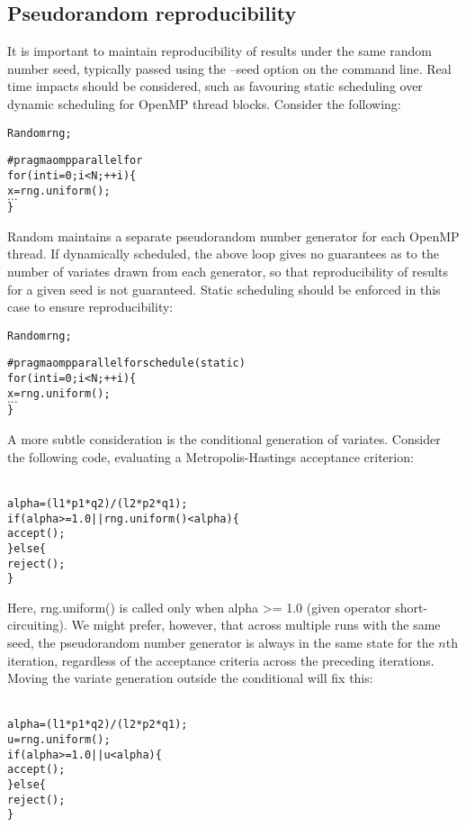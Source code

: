 \subsection{Pseudorandom reproducibility\label{Pseudorandom_reproducibility}}

It is important to maintain reproducibility of results under the same random
number seed, typically passed using the
\textsf{--seed} option on the command line. Real time impacts should be
considered, such as favouring static scheduling over
dynamic scheduling for OpenMP thread
blocks. Consider the following:
\begin{alltt}{\sf
    Random rng;

    #pragma omp parallel for
    for (int i = 0; i < N; ++i) \{
       x = rng.uniform();
       \(\ldots\)
    \}
}\end{alltt}

\textsf{Random} maintains a separate pseudorandom number
generator for each OpenMP thread. If
dynamically scheduled, the above loop gives no guarantees as to the number of
variates drawn from each generator, so that reproducibility of results for a
given seed is not guaranteed. Static scheduling should be enforced in this
case to ensure reproducibility:
\begin{alltt}{\sf
    Random rng;

    #pragma omp parallel for schedule(static)
    for (int i = 0; i < N; ++i) \{
       x = rng.uniform();
       \(\ldots\)
    \}
}\end{alltt}

A more subtle consideration is the conditional generation of
variates. Consider the following code, evaluating a
Metropolis-Hastings acceptance criterion:
\begin{alltt}{\sf
    alpha = (l1*p1*q2)/(l2*p2*q1);
    if (alpha >= 1.0 || rng.uniform() < alpha) \{
      accept();
    \} else \{
      reject();
    \}
}\end{alltt}
Here, \textsf{rng.uniform()} is called only when \textsf{alpha >= 1.0} (given
operator short-circuiting). We might prefer, however, that across multiple
runs with the same seed, the pseudorandom number generator is always in the
same state for the $n$th iteration, regardless of the acceptance criteria
across the preceding iterations. Moving the variate generation outside the
conditional will fix this:
\begin{alltt}{\sf
    alpha = (l1*p1*q2)/(l2*p2*q1);
    u = rng.uniform();
    if (alpha >= 1.0 || u < alpha) \{
      accept();
    \} else \{
      reject();
    \}
}\end{alltt}

